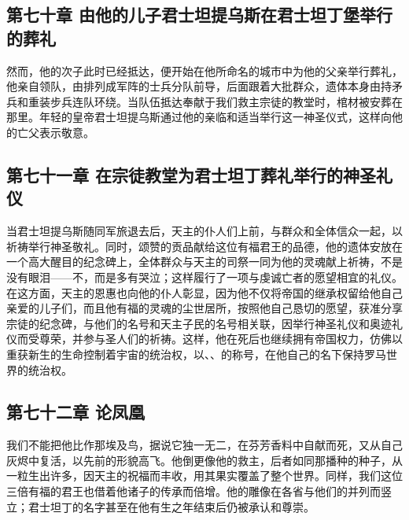 
\subsection{第七十章 由他的儿子君士坦提乌斯在君士坦丁堡举行的葬礼}

然而，他的次子此时已经抵达，便开始在他所命名的城市中为他的父亲举行葬礼，他亲自领队，由排列成军阵的士兵分队前导，后面跟着大批群众，遗体本身由持矛兵和重装步兵连队环绕。当队伍抵达奉献于我们救主宗徒的教堂时，棺材被安葬在那里。年轻的皇帝君士坦提乌斯通过他的亲临和适当举行这一神圣仪式，这样向他的亡父表示敬意。\par


\subsection{第七十一章 在宗徒教堂为君士坦丁葬礼举行的神圣礼仪}

当君士坦提乌斯随同军旅退去后，天主的仆人们上前，与群众和全体信众一起，以祈祷举行神圣敬礼。同时，颂赞的贡品献给这位有福君王的品德，他的遗体安放在一个高大醒目的纪念碑上，全体群众与天主的司祭一同为他的灵魂献上祈祷，不是没有眼泪——不，而是多有哭泣；这样履行了一项与虔诚亡者的愿望相宜的礼仪。在这方面，天主的恩惠也向他的仆人彰显，因为他不仅将帝国的继承权留给他自己亲爱的儿子们，而且他有福的灵魂的尘世居所，按照他自己恳切的愿望，获准分享宗徒的纪念碑，与他们的名号和天主子民的名号相关联，因举行神圣礼仪和奥迹礼仪而受尊荣，并参与圣人们的祈祷。这样，他在死后也继续拥有帝国权力，仿佛以重获新生的生命控制着宇宙的统治权，以、、的称号，在他自己的名下保持罗马世界的统治权。\par


\subsection{第七十二章 论凤凰}

我们不能把他比作那埃及鸟，据说它独一无二，在芬芳香料中自献而死，又从自己灰烬中复活，以先前的形貌高飞。他倒更像他的救主，后者如同那播种的种子，从一粒生出许多，因天主的祝福而丰收，用其果实覆盖了整个世界。同样，我们这位三倍有福的君王也借着他诸子的传承而倍增。他的雕像在各省与他们的并列而竖立；君士坦丁的名字甚至在他有生之年结束后仍被承认和尊崇。\par

